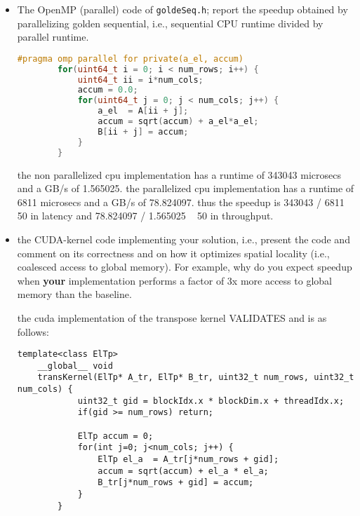 \documentclass{article}
\begin{document}
\begin{itemize}
    \item The OpenMP (parallel) code of \texttt{goldeSeq.h}; report the speedup obtained
   by parallelizing golden sequential, i.e., sequential CPU runtime divided by
   parallel runtime.

    \begin{lstlisting}[language=c]
        #pragma omp parallel for private(a_el, accum)
        for(uint64_t i = 0; i < num_rows; i++) {
            uint64_t ii = i*num_cols;
            accum = 0.0;
            for(uint64_t j = 0; j < num_cols; j++) {
                a_el  = A[ii + j];
                accum = sqrt(accum) + a_el*a_el;
                B[ii + j] = accum;
            }
        }
    \end{lstlisting}
    
    

    the non parallelized cpu implementation has a runtime of 343043 microsecs and a GB/s of 1.565025.
    the parallelized cpu implementation has a runtime of 6811 microsecs and a GB/s of 78.824097.
    thus the speedup is 343043 / 6811 ~ 50 in latency and 78.824097 / 1.565025 ~ 50 in throughput.

    \item the CUDA-kernel code implementing your solution, i.e., present the code and comment on
    its correctness and on how it optimizes spatial locality (i.e., coalesced
    access to global memory). For example, why do
    you expect speedup when \textbf{your} implementation
    performs a factor of 3x more access to global
    memory than the baseline.

    the cuda implementation of the transpose kernel VALIDATES and is as follows:

    \begin{lstlisting}[language=cuda]
    template<class ElTp>
    __global__ void 
    transKernel(ElTp* A_tr, ElTp* B_tr, uint32_t num_rows, uint32_t num_cols) {
            uint32_t gid = blockIdx.x * blockDim.x + threadIdx.x;
            if(gid >= num_rows) return;
        
            ElTp accum = 0;
            for(int j=0; j<num_cols; j++) {
                ElTp el_a  = A_tr[j*num_rows + gid];
                accum = sqrt(accum) + el_a * el_a;
                B_tr[j*num_rows + gid] = accum;
            }
        }
    \end{lstlisting}





\end{itemize}
\end{document}

